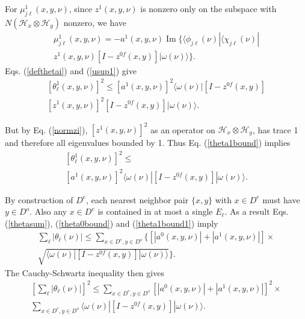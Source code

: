\documentclass[12pt,amsmath,amssymb,onecolumn]{revtex4-2}
\begin{document}
For $\mu^1_{j\ell}(x,y,\nu)$, since $z^1(x,y,\nu)$ is nonzero only on the
subspace with $N(\mathcal{H}_x \otimes \mathcal{H}_y)$ nonzero, we have
\begin{multline}
\label{usup1}
\mu^1_{j\ell}(x,y,\nu) =  -a^1(x,y,\nu) \operatorname{Im}\{  \langle \phi_{j\ell}(\nu)| \langle \chi_{j\ell}(\nu)| \\
z^1(x,y,\nu) [I - z^{0f}(x,y)]|\omega(\nu) \rangle \}.
\end{multline}
Eqs. (\ref{defthetai}) and (\ref{usup1}) give
\begin{multline}
\label{theta1bound}
[\theta^1_{\ell}(x,y,\nu)]^2 \le [a^1(x,y,\nu)]^2  \langle  \omega(\nu)| 
[I - z^{0f}(x,y)] \\
[z^1(x,y,\nu)]^2[I - z^{0f}(x,y)]|\omega(\nu) \rangle .
\end{multline}


But by Eq. (\ref{normzi}), $[z^1(x,y,\nu)]^2$ as an operator on 
$\mathcal{H}_x \otimes \mathcal{H}_y$, 
has trace 1 and therefore all eigenvalues
bounded by 1. Thus Eq. (\ref{theta1bound}) implies
\begin{multline}
\label{theta1bound1}
[\theta^1_{\ell}(x,y,\nu)]^2 \le \\ 
[a^1(x,y,\nu)]^2  \langle  \omega(\nu)| [I - z^{0f}(x,y)]|\omega(\nu) \rangle .
\end{multline}



By construction of $D^e$, each nearest neighbor pair $\{x,  y\}$ with $x \in D^e$
must have $y \in D^o$. Also any $x \in D^e$ is contained in at most
a single $E_\ell$.
As a result
Eqs. (\ref{thetasum}), (\ref{theta0bound}) and (\ref{theta1bound1}) imply
\begin{multline}
\label{thetafinal0}
\sum_{\ell} |\theta_{\ell}(\nu)| \le 
\sum_{x \in D^e, y \in D^o}  \{ [|a^0(x,y,\nu)| + |a^1(x,y,\nu)|] \times
\\ \sqrt{  \langle \omega(\nu)| [I - z^{0f}(x,y)]|\omega(\nu) \rangle } \}.
\end{multline}
The Cauchy-Schwartz inequality then gives
\begin{multline}
\label{thetafinal}
[\sum_{\ell} |\theta_{\ell}(\nu)|] ^ 2 \le
\sum_{x \in D^e, y \in D^o} [|a^0(x,y,\nu)| + |a^1(x,y,\nu)|]^2 \times
\\ \sum_{x \in D^e, y \in D^o}  \langle \omega(\nu)| [I - z^{0f}(x,y)]|\omega(\nu) \rangle .
\end{multline}
\end{document}
